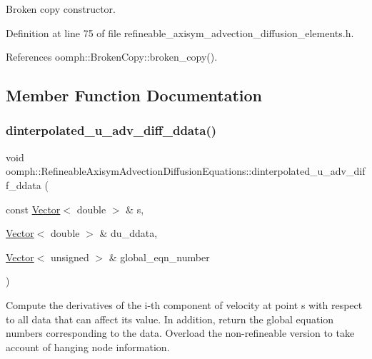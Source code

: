 Broken copy constructor. 



Definition at line 75 of file refineable\+\_\+axisym\+\_\+advection\+\_\+diffusion\+\_\+elements.\+h.



References oomph\+::\+Broken\+Copy\+::broken\+\_\+copy().



\subsection{Member Function Documentation}
\mbox{\label{classoomph_1_1RefineableAxisymAdvectionDiffusionEquations_ac1883d916d0393b4c505ca6506513f39}} 
\subsubsection{\texorpdfstring{dinterpolated\+\_\+u\+\_\+adv\+\_\+diff\+\_\+ddata()}{dinterpolated\_u\_adv\_diff\_ddata()}}
{\footnotesize\ttfamily void oomph\+::\+Refineable\+Axisym\+Advection\+Diffusion\+Equations\+::dinterpolated\+\_\+u\+\_\+adv\+\_\+diff\+\_\+ddata (\begin{DoxyParamCaption}\item[{const \hyperlink{classoomph_1_1Vector}{Vector}$<$ double $>$ \&}]{s,  }\item[{\hyperlink{classoomph_1_1Vector}{Vector}$<$ double $>$ \&}]{du\+\_\+ddata,  }\item[{\hyperlink{classoomph_1_1Vector}{Vector}$<$ unsigned $>$ \&}]{global\+\_\+eqn\+\_\+number }\end{DoxyParamCaption})\hspace{0.3cm}{\ttfamily [inline]}}



Compute the derivatives of the i-\/th component of velocity at point s with respect to all data that can affect its value. In addition, return the global equation numbers corresponding to the data. Overload the non-\/refineable version to take account of hanging node information. 



